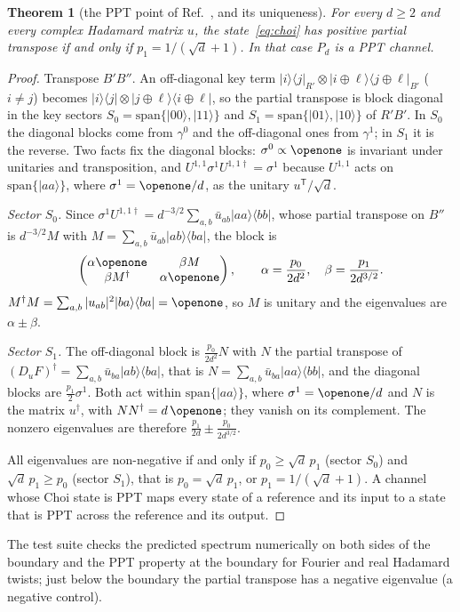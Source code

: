 \documentclass[aps,pra,twocolumn,superscriptaddress,nofootinbib,longbibliography,floatfix]{revtex4-2}
\newtheorem{theorem}{Theorem}
\newcommand{\ket}[1]{|#1\rangle}
\newcommand{\bra}[1]{\langle #1|}
\newcommand{\proj}[1]{|#1\rangle\langle #1|}
\begin{document}
\begin{theorem}[the PPT point of Ref.~\cite{horodecki2008low}, and its uniqueness]
\label{thm:ppt}
For every $d\ge2$ and every complex Hadamard matrix $u$, the state~\eqref{eq:choi} has positive partial transpose if and only if $p_1=1/(\sqrt d+1)$. In that case $P_d$ is a PPT channel.
\end{theorem}
\begin{proof}
Transpose $B'B''$. An off-diagonal key term $\ket i\!\bra j_{R'}\otimes\ket{i\oplus\ell}\!\bra{j\oplus\ell}_{B'}$ ($i\ne j$) becomes $\ket i\!\bra j\otimes\ket{j\oplus\ell}\!\bra{i\oplus\ell}$, so the partial transpose is block diagonal in the key sectors $S_0=\mathrm{span}\{\ket{00},\ket{11}\}$ and $S_1=\mathrm{span}\{\ket{01},\ket{10}\}$ of $R'B'$. In $S_0$ the diagonal blocks come from $\gamma^0$ and the off-diagonal ones from $\gamma^1$; in $S_1$ it is the reverse. Two facts fix the diagonal blocks: $\sigma^0\propto\openone$ is invariant under unitaries and transposition, and $U^{1,1}\sigma^1U^{1,1\dagger}=\sigma^1$ because $U^{1,1}$ acts on $\mathrm{span}\{\ket{aa}\}$, where $\sigma^1=\openone/d$, as the unitary $u^{\mathsf T}/\sqrt d$.

\emph{Sector $S_0$.} Since $\sigma^1U^{1,1\dagger}=d^{-3/2}\sum_{a,b}\bar u_{ab}\ket{aa}\!\bra{bb}$, whose partial transpose on $B''$ is $d^{-3/2}M$ with $M=\sum_{a,b}\bar u_{ab}\ket{ab}\!\bra{ba}$, the block is
\[
\begin{pmatrix}\alpha\openone&\beta M\\\beta M^\dagger&\alpha\openone\end{pmatrix},\qquad\alpha=\frac{p_0}{2d^2},\quad\beta=\frac{p_1}{2d^{3/2}}.
\]
$M^\dagger M=\sum_{a,b}|u_{ab}|^2\proj{ba}=\openone$, so $M$ is unitary and the eigenvalues are $\alpha\pm\beta$.

\emph{Sector $S_1$.} The off-diagonal block is $\frac{p_0}{2d^2}N$ with $N$ the partial transpose of $(D_uF)^\dagger=\sum_{a,b}\bar u_{ba}\ket{ab}\!\bra{ba}$, that is $N=\sum_{a,b}\bar u_{ba}\ket{aa}\!\bra{bb}$, and the diagonal blocks are $\frac{p_1}{2}\sigma^1$. Both act within $\mathrm{span}\{\ket{aa}\}$, where $\sigma^1=\openone/d$ and $N$ is the matrix $u^\dagger$, with $NN^\dagger=d\,\openone$; they vanish on its complement. The nonzero eigenvalues are therefore $\frac{p_1}{2d}\pm\frac{p_0}{2d^{3/2}}$.

All eigenvalues are non-negative if and only if $p_0\ge\sqrt d\,p_1$ (sector $S_0$) and $\sqrt d\,p_1\ge p_0$ (sector $S_1$), that is $p_0=\sqrt d\,p_1$, or $p_1=1/(\sqrt d+1)$. A channel whose Choi state is PPT maps every state of a reference and its input to a state that is PPT across the reference and its output.
\end{proof}
\noindent The test suite checks the predicted spectrum numerically on both sides of the boundary and the PPT property at the boundary for Fourier and real Hadamard twists; just below the boundary the partial transpose has a negative eigenvalue (a negative control).
\end{document}
